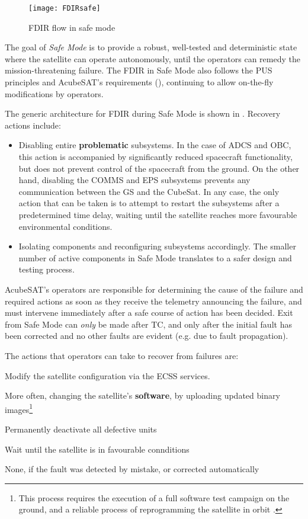 \documentclass[a4paper,nobib]{tufte-book}
\begin{document}
\begin{figure}[h]
	\texttt{[image: FDIRsafe]}
	\caption{\acs{FDIR} flow in safe mode}
	\label{fig:safeflow}
\end{figure}


The goal of \emph{Safe Mode} is to provide a robust, well-tested and deterministic state where the satellite can operate autonomously, until the operators can remedy the mission-threatening failure. The \acs{FDIR} in Safe Mode also follows the \acs{PUS} principles and AcubeSAT's requirements (), continuing to allow on-the-fly modifications by operators.

The generic architecture for \acs{FDIR} during Safe Mode is shown in . Recovery actions include:
\begin{itemize}
	\item Disabling entire \textbf{problematic} subsystems. In the case of \acs{ADCS} and \acs{OBC}, this action is accompanied by significantly reduced spacecraft functionality, but does not prevent control of the spacecraft from the ground. On the other hand, disabling the \acs{COMMS} and \acs{EPS} subsystems prevents any communication between the \acl{GS} and the CubeSat. In any case, the only action that can be taken is to attempt to restart the subsystems after a predetermined time delay, waiting until the satellite reaches more favourable environmental conditions.
	\item Isolating components and reconfiguring subsystems accordingly. The smaller number of active components in Safe Mode translates to a safer design and testing process.
\end{itemize}

AcubeSAT's operators are responsible for determining the cause of the failure and required actions as soon as they receive the telemetry announcing the failure, and must intervene immediately after a safe course of action has been decided. Exit from Safe Mode can \emph{only} be made after \acs{TC}, and only after the initial fault has been corrected and no other faults are evident (e.g. due to fault propagation).

The actions that operators can take to recover from failures are:
\begin{compactitem}
	\item Modify the satellite configuration via the \acs{ECSS} services.
	\item More often, changing the satellite's \textbf{software}, by uploading updated binary images\footnote{This process requires the execution of a full software test campaign on the ground, and a reliable process of reprogramming the satellite in orbit \autocite[45]{DDJF_OBSW}.}
	\item Permanently deactivate all defective units
	\item Wait until the satellite is in favourable connditions
	\item None, if the fault was detected by mistake, or corrected automatically
\end{compactitem}
\end{document}
